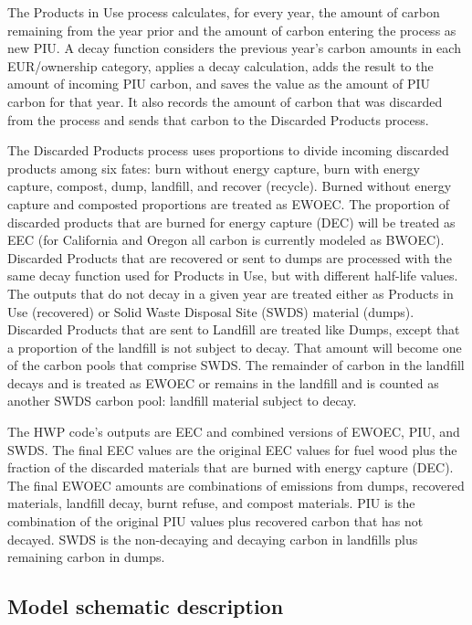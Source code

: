 \documentclass[
  openany]{book}
\begin{document}
The Products in Use process calculates, for every year, the amount of carbon remaining from the year prior and the amount of carbon entering the process as new PIU. A decay function considers the previous year's carbon amounts in each EUR/ownership category, applies a decay calculation, adds the result to the amount of incoming PIU carbon, and saves the value as the amount of PIU carbon for that year. It also records the amount of carbon that was discarded from the process and sends that carbon to the Discarded Products process.

The Discarded Products process uses proportions to divide incoming discarded products among six fates: burn without energy capture, burn with energy capture, compost, dump, landfill, and recover (recycle). Burned without energy capture and composted proportions are treated as EWOEC. The proportion of discarded products that are burned for energy capture (DEC) will be treated as EEC (for California and Oregon all carbon is currently modeled as BWOEC). Discarded Products that are recovered or sent to dumps are processed with the same decay function used for Products in Use, but with different half-life values. The outputs that do not decay in a given year are treated either as Products in Use (recovered) or Solid Waste Disposal Site (SWDS) material (dumps). Discarded Products that are sent to Landfill are treated like Dumps, except that a proportion of the landfill is not subject to decay. That amount will become one of the carbon pools that comprise SWDS. The remainder of carbon in the landfill decays and is treated as EWOEC or remains in the landfill and is counted as another SWDS carbon pool: landfill material subject to decay.

The HWP code's outputs are EEC and combined versions of EWOEC, PIU, and SWDS. The final EEC values are the original EEC values for fuel wood plus the fraction of the discarded materials that are burned with energy capture (DEC). The final EWOEC amounts are combinations of emissions from dumps, recovered materials, landfill decay, burnt refuse, and compost materials. PIU is the combination of the original PIU values plus recovered carbon that has not decayed. SWDS is the non-decaying and decaying carbon in landfills plus remaining carbon in dumps.

\hypertarget{model-func-schdesc}{%
\subsection{Model schematic description}\label{model-func-schdesc}}
\end{document}
